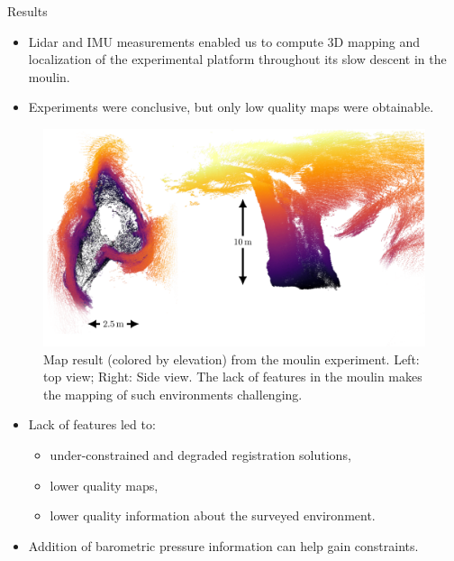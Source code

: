 \documentclass[final,hyperref={pdfpagelabels=false}]{beamer}
\begin{document}
\begin{frame}[t]
\begin{columns}[t]
\begin{column}{.465\textwidth}
\begin{block}{Results}
\begin{itemize}
	\item Lidar and IMU measurements enabled us to compute 3D mapping and localization of the experimental platform throughout its slow descent in the moulin.
	\item Experiments were conclusive, but only low quality maps were obtainable. 
\end{itemize}
\begin{figure}
\includegraphics[width=1.0\linewidth]{figures/moulin2.pdf}%
\vspace{-7mm}
\caption{Map result (colored by elevation) from the moulin experiment. Left: top view; Right: Side view. The lack of features in the moulin makes the mapping of such environments challenging.}
\label{fig:3D-map}
\end{figure}
\begin{itemize}
	\item Lack of features led to: 
	\begin{itemize}
		\item under-constrained and degraded registration solutions,
		\item lower quality maps,
		\item lower quality information about the surveyed environment.
	\end{itemize}
	\item Addition of barometric pressure information can help gain constraints.
\end{itemize}
\end{block}



\end{column}
\end{columns}
\end{frame}
\end{document}
